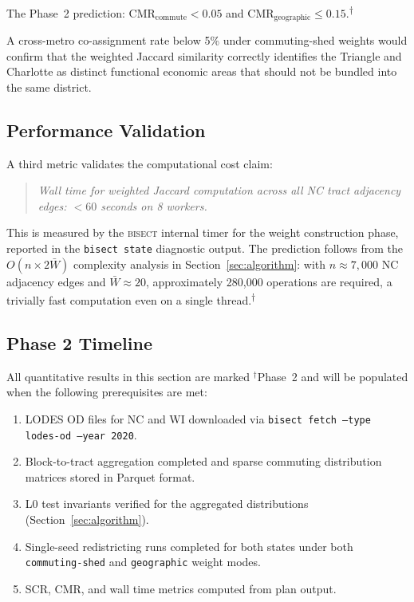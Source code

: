 The Phase~2 prediction:
$\mathrm{CMR}_{\mathrm{commute}} < 0.05$ and
$\mathrm{CMR}_{\mathrm{geographic}} \leq 0.15$.\textsuperscript{$\dagger$}

A cross-metro co-assignment rate below 5\% under commuting-shed weights
would confirm that the weighted Jaccard similarity correctly identifies
the Triangle and Charlotte as distinct functional economic areas that should
not be bundled into the same district.

\subsection{Performance Validation}

A third metric validates the computational cost claim:

\begin{quote}
  \textit{Wall time for weighted Jaccard computation across all NC tract
  adjacency edges: $<60$ seconds on 8 workers.}
\end{quote}

This is measured by the \textsc{bisect} internal timer for the weight
construction phase, reported in the \texttt{bisect state} diagnostic
output.
The prediction follows from the $O(n \times 2\bar{W})$ complexity analysis
in Section~\ref{sec:algorithm}: with $n \approx 7{,}000$ NC adjacency edges
and $\bar{W} \approx 20$, approximately 280,000 operations are required,
a trivially fast computation even on a single thread.\textsuperscript{$\dagger$}

\subsection{Phase 2 Timeline}

All quantitative results in this section are marked ${}^{\dagger}$Phase~2
and will be populated when the following prerequisites are met:

\begin{enumerate}
  \item LODES OD files for NC and WI downloaded via
    \texttt{bisect fetch --type lodes-od --year 2020}.
  \item Block-to-tract aggregation completed and sparse commuting
    distribution matrices stored in Parquet format.
  \item L0 test invariants verified for the aggregated distributions
    (Section~\ref{sec:algorithm}).
  \item Single-seed redistricting runs completed for both states under
    both \texttt{commuting-shed} and \texttt{geographic} weight modes.
  \item SCR, CMR, and wall time metrics computed from plan output.
\end{enumerate}

